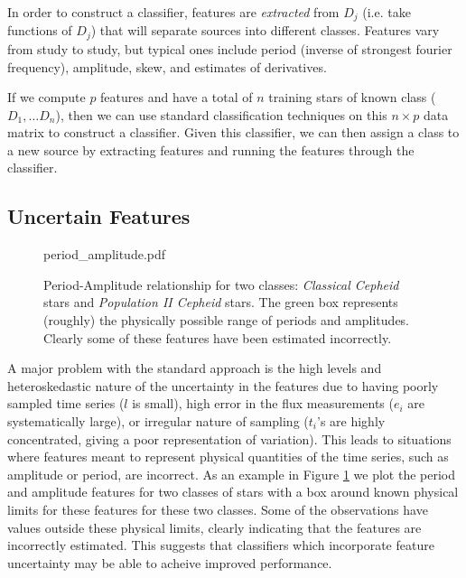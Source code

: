 \documentclass[11pt]{article}
\begin{document}
In order to construct a classifier, features are \textit{extracted} from $D_j$ (i.e. take functions of $D_j$) that will separate sources into different classes. Features vary from study to study, but typical ones include period (inverse of strongest fourier frequency), amplitude, skew, and estimates of derivatives.

If we compute $p$ features and have a total of $n$ training stars of known class ($D_1, \ldots D_n$), then we can use standard classification techniques on this $n\times p$ data matrix to construct a classifier. Given this classifier, we can then assign a class to a new source by extracting features and running the features through the classifier.


\subsection{Uncertain Features}
\begin{figure}[h]
  \begin{center}
    \begin{includegraphics}[scale=.5]{period_amplitude.pdf}
      \caption{Period-Amplitude relationship for two classes: \textit{Classical Cepheid} stars and \textit{Population II Cepheid} stars. The green box represents (roughly) the physically possible range of periods and amplitudes. Clearly some of these features have been estimated incorrectly.\label{fig:period_amplitude}}
    \end{includegraphics}
  \end{center}
\end{figure}
A major problem with the standard approach is the high levels and heteroskedastic nature of the uncertainty in the features due to having poorly sampled time series ($l$ is small), high error in the flux measurements ($e_{i}$ are systematically large), or irregular nature of sampling ($t_i$'s are highly concentrated, giving a poor representation of variation). This leads to situations where features meant to represent physical quantities of the time series, such as amplitude or period, are incorrect. As an example in Figure \ref{fig:period_amplitude} we plot the period and amplitude features for two classes of stars with a box around known physical limits for these features for these two classes. Some of the observations have values outside these physical limits, clearly indicating that the features are incorrectly estimated. This suggests that classifiers which incorporate feature uncertainty may be able to acheive improved performance.
\end{document}
